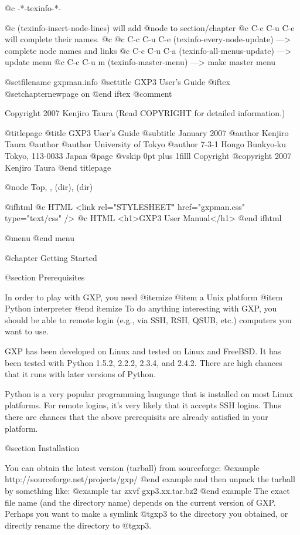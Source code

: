   @c -*-texinfo-*-

@c (texinfo-insert-node-lines) will add @node to section/chapter
@c C-c C-u C-e will complete their names.
@c 
@c C-c C-u C-e  (texinfo-every-node-update) ---> complete node names and links
@c C-c C-u C-a  (texinfo-all-menus-update)  ---> update menu
@c C-c C-u m    (texinfo-master-menu)       ---> make master menu

@setfilename gxpman.info
@settitle GXP3 User's Guide
@iftex
@setchapternewpage on
@end iftex
@comment %


Copyright 2007 Kenjiro Taura (Read COPYRIGHT for detailed information.)


@titlepage
@title GXP3 User's Guide
@subtitle January 2007
@author Kenjiro Taura
@author
@author University of Tokyo
@author 7-3-1 Hongo Bunkyo-ku Tokyo, 113-0033 Japan
@page
@vskip 0pt plus 1filll
Copyright @copyright{} 2007 Kenjiro Taura
@end titlepage

@node Top, , (dir), (dir)

@ifhtml
@c HTML <link rel="STYLESHEET" href="gxpman.css" type="text/css" />
@c HTML <h1>GXP3 User Manual</h1>
@end ifhtml




@menu
@end menu





@chapter Getting Started


@section Prerequisites

In order to play with GXP, you need
@itemize
@item a Unix platform
@item Python interpreter
@end itemize
To do anything interesting with GXP, you should be able to remote
login (e.g., via SSH, RSH, QSUB, etc.) computers you want to use.

GXP has been developed on Linux and tested on Linux and FreeBSD.  It
has been tested with Python 1.5.2, 2.2.2, 2.3.4, and 2.4.2.  There are
high chances that it runs with later versions of Python.

Python is a very popular programming language that is installed on
most Linux platforms. For remote logins, it's very likely that it
accepts SSH logins. Thus there are chances that the above prerequisits
are already satisfied in your platform.

@section Installation

You can obtain the latest version (tarball) from sourceforge:
@example
    http://sourceforge.net/projects/gxp/
@end example
and then unpack the tarball by something like:
@example
    tar zxvf gxp3.xx.tar.bz2
@end example
The exact file name (and the directory name) depends on the current
version of GXP. Perhaps you want to make a symlink @t{gxp3} to the
directory you obtained, or directly rename the directory to @t{gxp3}.

